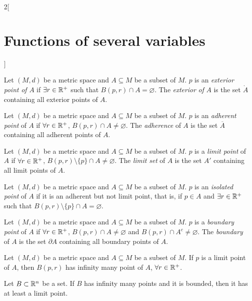\documentclass[../../../main.tex]{subfiles}
\begin{document}
\begin{multicols}{2}[\section{Functions of several variables}]
    \begin{definition}
        Let $(M,d)$ be a metric space and $A\subseteq M$ be a subset of $M$. $p$ is an \textit{exterior point of $A$} if $\exists r\in\mathbb{R}^+$ such that $B(p,r)\cap A=\varnothing$. The \textit{exterior of $A$} is the set $\mathring A$ containing all exterior points of $A$.
    \end{definition}
    \begin{definition}
        Let $(M,d)$ be a metric space and $A\subseteq M$ be a subset of $M$. $p$ is an \textit{adherent point} of $A$ if $\forall r\in\mathbb{R}^+$, $B(p,r)\cap A\ne\varnothing$. The \textit{adherence} of $A$ is the set $\overline{A}$ containing all adherent points of $A$.
    \end{definition}
    \begin{definition}
        Let $(M,d)$ be a metric space and $A\subseteq M$ be a subset of $M$. $p$ is a \textit{limit point} of $A$ if $\forall r\in\mathbb{R}^+$, $B(p,r)\setminus\{p\}\cap A\ne\varnothing$. The \textit{limit set} of $A$ is the set $A'$ containing all limit points of $A$.
    \end{definition}
    \begin{definition}
        Let $(M,d)$ be a metric space and $A\subseteq M$ be a subset of $M$. $p$ is an \textit{isolated point} of $A$ if it is an adherent but not limit point, that is, if $p\in A$ and $\exists r\in\mathbb{R}^+$ such that $B(p,r)\setminus\{p\}\cap A=\varnothing$.
    \end{definition}
    \begin{definition}
        Let $(M,d)$ be a metric space and $A\subseteq M$ be a subset of $M$. $p$ is a \textit{boundary point} of $A$ if $\forall r\in\mathbb{R}^+$, $B(p,r)\cap A\ne\varnothing$ and $B(p,r)\cap A^c\ne\varnothing$. The \textit{boundary} of $A$ is the set $\partial A$ containing all boundary points of $A$.
    \end{definition}
    \begin{prop}
        Let $(M,d)$ be a metric space and $A\subseteq M$ be a subset of $M$. If $p$ is a limit point of $A$, then $B(p,r)$ has infinity many point of $A$, $\forall r\in\mathbb{R}^+$.
    \end{prop}
    \begin{theorem}
        Let $B\subset\mathbb{R}^n$ be a set. If $B$ has infinity many points and it is bounded, then it has at least a limit point.
    \end{theorem}
    \begin{definition}

\end{definition}
\end{multicols}
\end{document}
